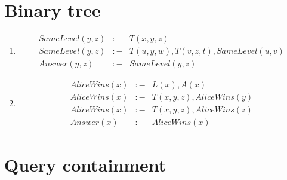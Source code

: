 \documentclass[12pt]{article}
\begin{document}
\section{Binary tree}

\begin{enumerate}
\item %
%
\begin{eqnarray*}
SameLevel(y,z) & :- & T(x,y,z)\\
SameLevel(y,z) & :- & T(u,y,w),T(v,z,t),SameLevel(u,v)\\
Answer(y,z) & :- & SameLevel(y,z)
\end{eqnarray*}
%
\item %
%
\begin{eqnarray*}
AliceWins(x) & :- & L(x),A(x)\\
AliceWins(x) & :- & T(x,y,z),AliceWins(y)\\
AliceWins(x) & :- & T(x,y,z),AliceWins(z)\\
Answer(x) & :- & AliceWins(x)
\end{eqnarray*}
%
\end{enumerate}

\pagebreak

\section{Query containment}
\end{document}

